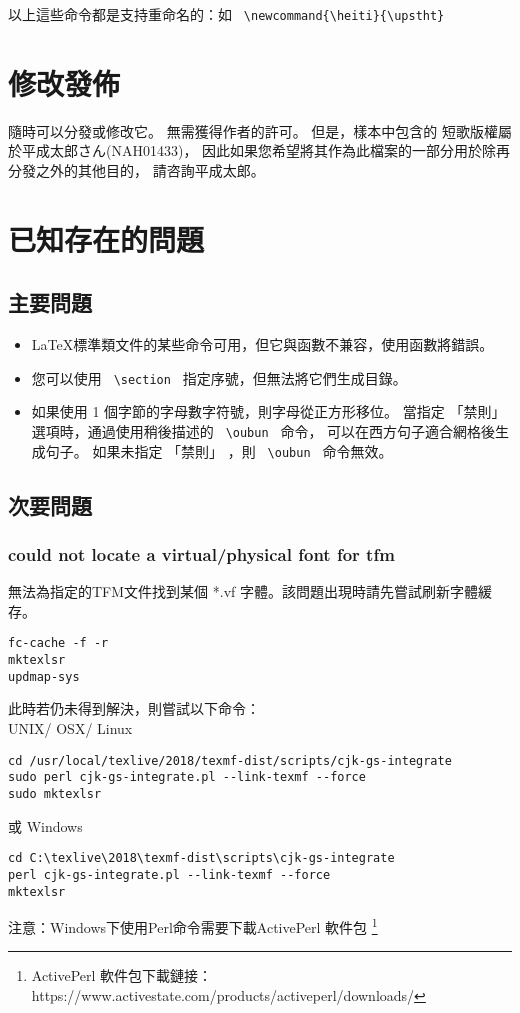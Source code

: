 \documentclass[a4,11pt,uplatex,openleft]{jsarticle}
\begin{document}
以上這些命令都是支持重命名的：如 \verb+ \newcommand{\heiti}{\upstht} +




\section{修改\quad 發佈}
隨時可以分發或修改它。 無需獲得作者的許可。
但是，樣本中包含的 短歌版權屬於平成太郎さん(NAH01433)，
因此如果您希望將其作為此檔案的一部分用於除再分發之外的其他目的，
請咨詢平成太郎。

\section{已知存在的問題}

\subsection{主要問題}
\begin{itemize}
\item \LaTeX 標準類文件的某些命令可用，但它與函數不兼容，使用函數將錯誤。
\item 您可以使用 \verb+ \section + 指定序號，但無法將它們生成目錄。
\item 如果使用 1 個字節的字母數字符號，則字母從正方形移位。
當指定 「禁則」 選項時，通過使用稍後描述的 \verb+ \oubun + 命令，
可以在西方句子適合網格後生成句子。
如果未指定 「禁則」 ，則 \verb+ \oubun + 命令無效。
\end{itemize}


\subsection{次要問題}

\subsubsection{could not locate a virtual/physical font for tfm} \label{TFM}
\par 無法為指定的TFM文件找到某個 *.vf 字體。該問題出現時請先嘗試刷新字體緩存。
\begin{lstlisting}
fc-cache -f -r
mktexlsr
updmap-sys
\end{lstlisting}

\par 此時若仍未得到解決，則嘗試以下命令：\\
UNIX/ OSX/ Linux
\begin{lstlisting}
cd /usr/local/texlive/2018/texmf-dist/scripts/cjk-gs-integrate
sudo perl cjk-gs-integrate.pl --link-texmf --force
sudo mktexlsr
\end{lstlisting}
或 Windows
\begin{lstlisting}
cd C:\texlive\2018\texmf-dist\scripts\cjk-gs-integrate
perl cjk-gs-integrate.pl --link-texmf --force
mktexlsr
\end{lstlisting}
注意：Windows下使用Perl命令需要下載ActivePerl 軟件包
\footnote{ActivePerl 軟件包下載鏈接：
https://www.activestate.com/products/activeperl/downloads/}
\end{document}
